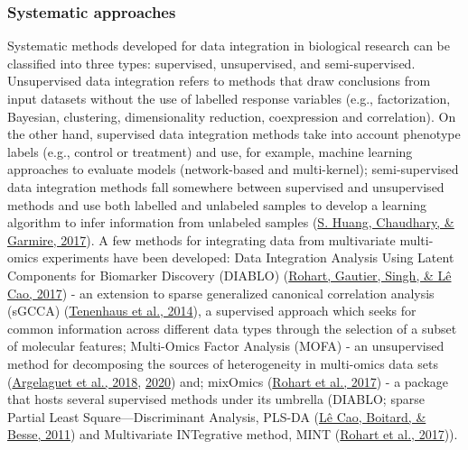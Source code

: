 \documentclass[12pt,twoside]{reedthesis}
\begin{document}
\hypertarget{systematic-approaches}{%
\subsubsection{Systematic approaches}\label{systematic-approaches}}

Systematic methods developed for data integration in biological research
can be classified into three types: supervised, unsupervised, and
semi-supervised. Unsupervised data integration refers to methods that
draw conclusions from input datasets without the use of labelled
response variables (e.g., factorization, Bayesian, clustering,
dimensionality reduction, coexpression and correlation). On the other
hand, supervised data integration methods take into account phenotype
labels (e.g., control or treatment) and use, for example, machine
learning approaches to evaluate models (network-based and multi-kernel);
semi-supervised data integration methods fall somewhere between
supervised and unsupervised methods and use both labelled and unlabeled
samples to develop a learning algorithm to infer information from
unlabeled samples (\protect\hyperlink{ref-huang2017}{S. Huang, Chaudhary, \& Garmire, 2017}). A few methods for integrating data from
multivariate multi-omics experiments have been developed: Data
Integration Analysis Using Latent Components for Biomarker Discovery
(DIABLO) (\protect\hyperlink{ref-rohart2017}{Rohart, Gautier, Singh, \& Lê Cao, 2017}) - an extension to sparse generalized canonical
correlation analysis (sGCCA) (\protect\hyperlink{ref-tenenhaus2014}{Tenenhaus et al., 2014}), a supervised approach
which seeks for common information across different data types through
the selection of a subset of molecular features; Multi-Omics Factor
Analysis (MOFA) - an unsupervised method for decomposing the sources of
heterogeneity in multi-omics data sets (\protect\hyperlink{ref-argelaguet2018}{Argelaguet et al., 2018}, \protect\hyperlink{ref-argelaguet2020}{2020}) and; mixOmics (\protect\hyperlink{ref-rohart2017}{Rohart et al., 2017}) - a package that hosts
several supervised methods under its umbrella (DIABLO; sparse Partial
Least Square---Discriminant Analysis, PLS-DA (\protect\hyperlink{ref-luxeacao2011}{Lê Cao, Boitard, \& Besse, 2011}) and
Multivariate INTegrative method, MINT (\protect\hyperlink{ref-rohart2017}{Rohart et al., 2017})).
\end{document}
